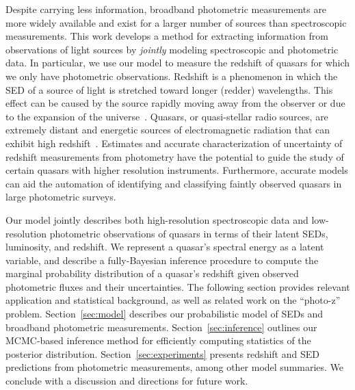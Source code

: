 \documentclass{article}
\newcommand{\red}[1]{\textcolor{red}{[TODO: #1]}}
\begin{document}
Despite carrying less information, broadband photometric measurements are more widely available and exist for a larger number of sources than spectroscopic measurements. 
This work develops a method for extracting information from observations of light sources by \emph{jointly} modeling spectroscopic and photometric data.  
In particular, we use our model to measure the redshift of quasars for which we only have photometric observations.  
Redshift is a phenomenon in which the SED of a source of light is stretched toward longer (redder) wavelengths.  This effect can be caused by the source rapidly moving away from the observer or due to the expansion of the universe~\cite{harrison1993redshift}.  
Quasars, or quasi-stellar radio sources, are extremely distant and energetic sources of electromagnetic radiation that can exhibit high redshift~\cite{silk1997quasars}.  
Estimates and accurate characterization of uncertainty of redshift measurements from photometry have the potential to guide the study of certain quasars with higher resolution instruments.  
Furthermore, accurate models can aid the automation of identifying and classifying faintly observed quasars in large photometric surveys.  

Our model jointly describes both high-resolution spectroscopic data and low-resolution photometric observations of quasars in terms of their latent SEDs, luminosity, and redshift.  We represent a quasar's spectral energy as a latent variable, and describe a fully-Bayesian inference procedure to compute the marginal probability distribution of a quasar's redshift given observed photometric fluxes and their uncertainties.  The following section provides relevant application and statistical background, as well as related work on the ``photo-z'' problem.  Section~\ref{sec:model} describes our probabilistic model of SEDs and broadband photometric measurements.  Section~\ref{sec:inference} outlines our MCMC-based inference method for efficiently computing statistics of the posterior distribution. Section~\ref{sec:experiments} presents redshift and SED predictions from photometric measurements, among other model summaries.  We conclude with a discussion and directions for future work.  
\end{document}
